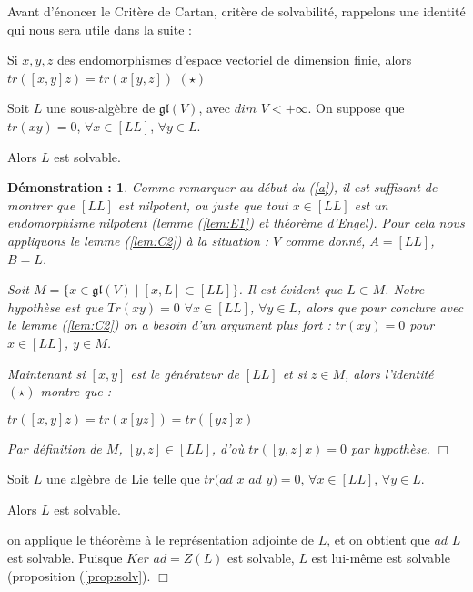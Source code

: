 \documentclass[a4paper,openany,12pt]{report}
\newcommand{\gl}{\mathfrak{gl}}
\theoremstyle{break}
{\theorembodyfont{\upshape}
\newtheorem*{rmq}{Remarque :}
\newtheorem*{prv}{Preuve :}
\newtheorem*{ex}{Exemples :}
\newtheorem{exe}{Exemple : }
\newtheorem*{nota}{Notation :}}
\newtheorem*{dem}{D\'emonstration :}
\begin{document}
Avant d'énoncer le Critère de Cartan, critère de solvabilité, rappelons une identité qui nous sera utile dans la suite : 
\begin{center}
Si $x,y,z$ des endomorphismes d'espace vectoriel de dimension finie, alors $tr([x,y]z)=tr(x[y,z])$ $(\star)$
\end{center}

\begin{thm}\label{th:cartan}
Soit $L$ une sous-algèbre de $\gl(V)$, avec $dim$ $V<+\infty$. On suppose que $tr(xy)=0$, $\forall x \in [LL]$, $\forall y \in L$.

Alors $L$ est solvable. 
\end{thm}

\begin{dem}
\quad Comme remarquer au début du (\ref{a}), il est suffisant de montrer que $[LL]$ est nilpotent, ou juste que tout $x \in [LL]$ est un endomorphisme nilpotent (lemme (\ref{lem:E1}) et théorème d'Engel). Pour cela nous appliquons le lemme (\ref{lem:C2}) à la situation : $V$ comme donné, $A=[LL]$, $B=L$.

Soit $M= \{ x \in \gl(V) \mid [x,L] \subset [LL] \}$. Il est évident que $L \subset M$. Notre hypothèse est que $Tr(xy)=0$ $\forall x \in [LL]$, $\forall y \in L$, alors que pour conclure avec le lemme (\ref{lem:C2}) on a besoin d'un argument plus fort : \quad $tr(xy)=0$ pour $x \in [LL]$, $y \in M$.

Maintenant si $[x,y]$ est le générateur de $[LL]$ et si $z \in M$, alors l'identité $(\star)$ montre que :
\begin{center}
$tr([x,y]z)=tr(x[yz])=tr([yz]x)$
\end{center}
Par définition de $M$, $[y,z] \in [LL]$, d'où $tr([y,z]x)=0$ par hypothèse. $\Box$
\end{dem}

\begin{cor}
\quad Soit $L$ une algèbre de Lie telle que $tr(ad$ $x$ $ad$ $y) = 0$, $\forall x \in [LL]$, $\forall y \in  L$.

Alors $L$ est solvable.
\end{cor}

\begin{prv}
\quad on applique le théorème à le représentation adjointe de $L$, et on obtient que $ad$ $L$ est solvable. Puisque $Ker$ $ad = Z(L)$ est solvable, $L$ est lui-même est solvable (proposition (\ref{prop:solv}). $\Box$
\end{prv}
\end{document}
